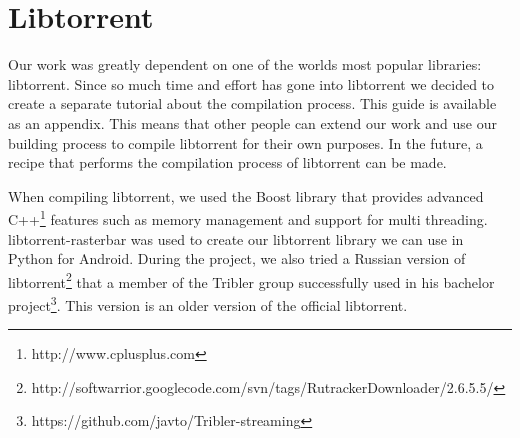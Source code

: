 \section{Libtorrent}
	Our work was greatly dependent on one of the worlds most popular libraries: libtorrent. Since so much time and effort has gone into libtorrent  we decided to create a separate tutorial about the compilation process. This guide is available as an appendix. This means that other people can extend our work and use our building process to compile libtorrent for their own purposes. In the future, a recipe that performs the compilation process of libtorrent can be made.
	
	When compiling libtorrent, we used the Boost library that provides advanced C++\footnote{http://www.cplusplus.com} features such as memory management and support for multi threading. libtorrent-rasterbar was used to create our libtorrent library we can use in Python for Android. During the project, we also tried a Russian version of libtorrent\footnote{http://softwarrior.googlecode.com/svn/tags/RutrackerDownloader/2.6.5.5/} that a member of the Tribler group successfully used in his bachelor project\footnote{https://github.com/javto/Tribler-streaming}. This version is an older version of the official libtorrent.